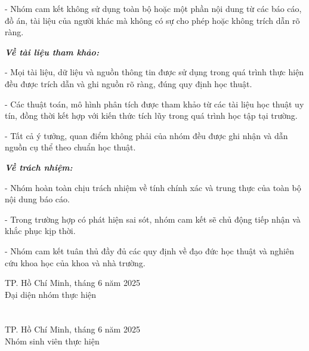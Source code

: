 \documentclass[12pt,a4paper]{report}
\begin{document}
- Nhóm cam kết không sử dụng toàn bộ hoặc một phần nội dung từ các báo cáo, đồ án, tài liệu của người khác mà không có sự cho phép hoặc không trích dẫn rõ ràng.

\textbf{\textit{Về tài liệu tham khảo:}}

- Mọi tài liệu, dữ liệu và nguồn thông tin được sử dụng trong quá trình thực hiện đều được trích dẫn và ghi nguồn rõ ràng, đúng quy định học thuật.

- Các thuật toán, mô hình phân tích được tham khảo từ các tài liệu học thuật uy tín, đồng thời kết hợp với kiến thức tích lũy trong quá trình học tập tại trường.

- Tất cả ý tưởng, quan điểm không phải của nhóm đều được ghi nhận và dẫn nguồn cụ thể theo chuẩn học thuật.

\textbf{\textit{Về trách nhiệm:}}

- Nhóm hoàn toàn chịu trách nhiệm về tính chính xác và trung thực của toàn bộ nội dung báo cáo.

- Trong trường hợp có phát hiện sai sót, nhóm cam kết sẽ chủ động tiếp nhận và khắc phục kịp thời.

- Nhóm cam kết tuân thủ đầy đủ các quy định về đạo đức học thuật và nghiên cứu khoa học của khoa và nhà trường.

\begin{flushright}
TP. Hồ Chí Minh, tháng 6 năm 2025\\
Đại diện nhóm thực hiện \\
\end{flushright}

\chapter*{}
\noindent \indent 

\vspace{2em}

\begin{flushright}
TP. Hồ Chí Minh, tháng 6 năm 2025\\
Nhóm sinh viên thực hiện
\end{flushright}




\renewcommand{\contentsname}{}        %
\renewcommand{\listtablename}{}       %
\renewcommand{\listfigurename}{}      %

\chapter*{}
\tableofcontents
\end{document}
